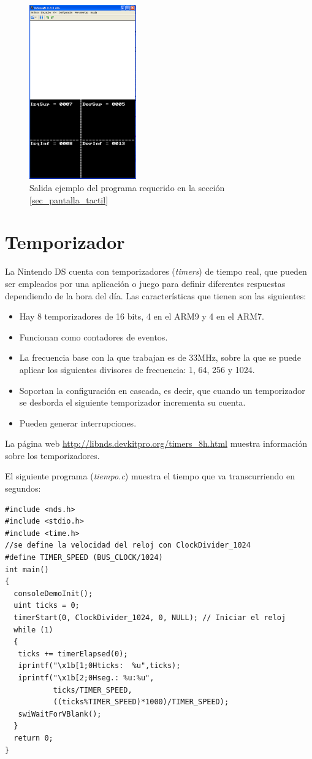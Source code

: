 \begin{figure}[t]
\centering
\includegraphics[height=7.5cm]{Figuras/C3/c3_tactil1.png}
\caption{Salida ejemplo del programa requerido en la sección \ref{sec_pantalla_tactil}}
\label{fig_p3_c3_4zonas}
\end{figure}

\section{Temporizador}
La Nintendo DS cuenta con temporizadores (\textit{timers}) de tiempo real, que pueden ser empleados por una aplicación o juego para definir diferentes respuestas dependiendo de la hora del día. Las características que tienen son las siguientes:

\begin{itemize}
	\item Hay 8 temporizadores de 16 bits, 4 en el ARM9 y 4 en el ARM7.
	\item Funcionan como contadores de eventos.
	\item La frecuencia base con la que trabajan es de 33MHz, sobre la que se puede aplicar los siguientes divisores de frecuencia: 1, 64, 256 y 1024.
	\item Soportan la configuración en cascada, es decir, que cuando un temporizador se desborda el si\-guien\-te temporizador incrementa su cuenta.
	\item Pueden generar interrupciones. 
\end{itemize}

La página web \url{http://libnds.devkitpro.org/timers_8h.html} muestra información sobre los temporizadores.

El siguiente programa (\textit{tiempo.c}) muestra el tiempo que va transcurriendo en segundos:
\begin{lstlisting}
#include <nds.h>
#include <stdio.h>
#include <time.h>
//se define la velocidad del reloj con ClockDivider_1024
#define TIMER_SPEED (BUS_CLOCK/1024)
int main()
{
  consoleDemoInit();
  uint ticks = 0;
  timerStart(0, ClockDivider_1024, 0, NULL); // Iniciar el reloj
  while (1)
  {
   ticks += timerElapsed(0);  
   iprintf("\x1b[1;0Hticks:  %u",ticks);
   iprintf("\x1b[2;0Hseg.: %u:%u",
           ticks/TIMER_SPEED,
           ((ticks%TIMER_SPEED)*1000)/TIMER_SPEED);
   swiWaitForVBlank();
  }
  return 0;
}
\end{lstlisting}

